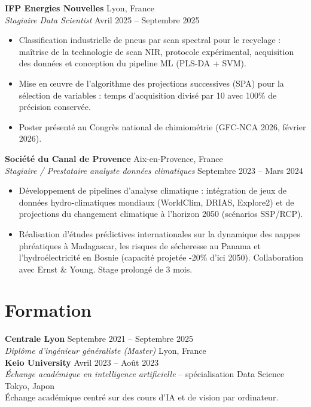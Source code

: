 \documentclass[10pt, a4paper]{article}
\begin{document}
\textbf{IFP Energies Nouvelles} \hfill Lyon, France\\
\textit{Stagiaire Data Scientist} \hfill \small Avril 2025 -- Septembre 2025
\begin{itemize}
    \item Classification industrielle de pneus par scan spectral pour le recyclage : maîtrise de la technologie de scan NIR, protocole expérimental, acquisition des données et conception du pipeline ML (PLS-DA + SVM).
    \item Mise en œuvre de l'algorithme des projections successives (SPA) pour la sélection de variables : temps d'acquisition divisé par 10 avec 100\% de précision conservée.
    \item Poster présenté au Congrès national de chimiométrie (GFC-NCA 2026, février 2026).
\end{itemize}

\textbf{Société du Canal de Provence} \hfill Aix-en-Provence, France\\
\textit{Stagiaire / Prestataire analyste données climatiques} \hfill \small Septembre 2023 -- Mars 2024
\begin{itemize}
    \item Développement de pipelines d'analyse climatique : intégration de jeux de données hydro-climatiques mondiaux (WorldClim, DRIAS, Explore2) et de projections du changement climatique à l'horizon 2050 (scénarios SSP/RCP).
    \item Réalisation d'études prédictives internationales sur la dynamique des nappes phréatiques à Madagascar, les risques de sécheresse au Panama et l'hydroélectricité en Bosnie (capacité projetée -20\% d'ici 2050). Collaboration avec Ernst \& Young. Stage prolongé de 3 mois.
\end{itemize}

\section{Formation}

\textbf{Centrale Lyon} \hfill Septembre 2021 -- Septembre 2025\\
\textit{Diplôme d'ingénieur généraliste (Master)} \hfill Lyon, France\\[2pt]
\textbf{Keio University} \hfill Avril 2023 -- Août 2023\\
\textit{Échange académique en intelligence artificielle} -- spécialisation Data Science \hfill Tokyo, Japon\\
\small Échange académique centré sur des cours d'IA et de vision par ordinateur.
\end{document}
